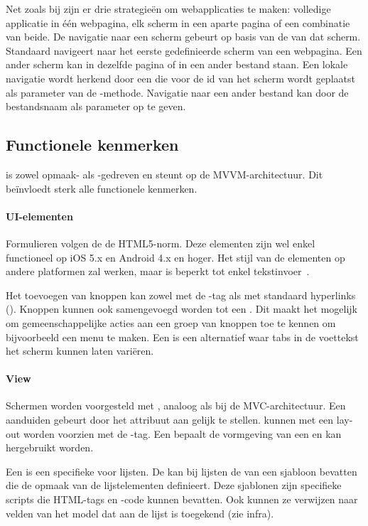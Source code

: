 Net zoals bij \jqm{} zijn er drie strategieën om webapplicaties te maken:  volledige applicatie in één webpagina,  elk scherm in een aparte pagina of een combinatie van beide.
De navigatie naar een scherm gebeurt op basis van de  van dat scherm.
Standaard navigeert \kendo{} naar het eerste gedefinieerde scherm van een webpagina.
Een ander scherm kan in dezelfde pagina of in een ander bestand staan.
Een lokale navigatie wordt herkend door een  die voor de id van het scherm wordt geplaatst als parameter van de -methode.
Navigatie naar een ander bestand kan door de bestandsnaam als parameter op te geven.

\subsection{Functionele kenmerken}
\label{sec:kendo-functioneel}
\kendo{} is zowel opmaak- als \js{}-gedreven en steunt op de MVVM-architectuur.
Dit beïnvloedt sterk alle functionele kenmerken.

\paragraph{UI-elementen}
Formulieren volgen de de HTML5-norm. 
Deze elementen zijn wel enkel functioneel op iOS 5.x en Android 4.x en hoger.  
Het stijl van de elementen op andere platformen zal werken, maar is beperkt tot  enkel tekstinvoer~\cite{Telerike}.

Het toevoegen van knoppen kan zowel met de -tag als met standaard hyperlinks ().
Knoppen kunnen ook samengevoegd worden tot een .
Dit maakt het mogelijk om gemeenschappelijke acties aan een groep van knoppen toe te kennen om bijvoorbeeld een menu te maken.
Een  is een alternatief waar tabs in de voettekst het scherm kunnen laten variëren.

\paragraph{View}
Schermen worden voorgesteld met ,  analoog als bij de MVC-architectuur.
Een  aanduiden gebeurt door het attribuut  aan  gelijk te stellen.
 kunnen met een lay-out worden voorzien met de -tag.
Een  bepaalt de vormgeving van een  en kan hergebruikt worden.

Een  is een specifieke  voor lijsten.
De  kan bij lijsten de  van een sjabloon bevatten die de opmaak van de lijstelementen definieert.
Deze sjablonen zijn specifieke \kendo{} scripts die HTML-tags en \js{}-code kunnen bevatten.
Ook kunnen ze verwijzen naar velden van het model dat aan de lijst is toegekend (zie infra).

